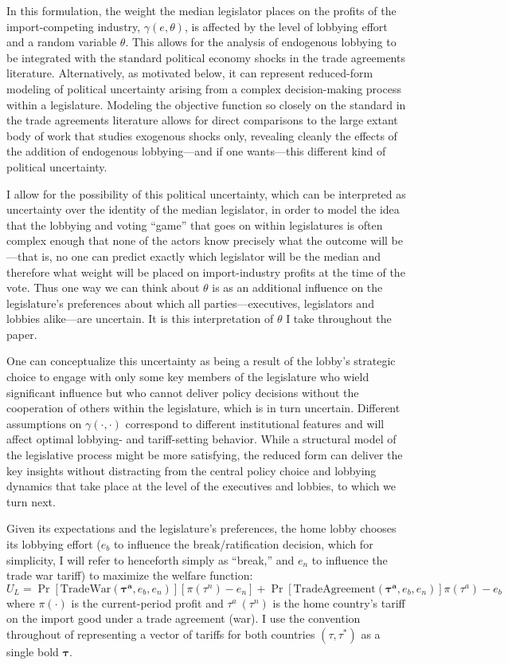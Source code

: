 \documentclass[10pt]{article}
\newcommand{\ve}{\theta}
\newcommand{\ta}{\theta}
\newcommand{\bta}{\bm{\tau^a}}
\newcommand{\ga}{\gamma}
\begin{document}
In this formulation, the weight the median legislator places on the profits of the import-competing industry, $\ga(e,\ve)$, is affected by the level of lobbying effort and a random variable $\ta$. This allows for the analysis of endogenous lobbying to be integrated with the standard political economy shocks in the trade agreements literature. Alternatively, as motivated below, it can represent reduced-form modeling of political uncertainty arising from a complex decision-making process within a legislature. Modeling the objective function so closely on the standard in the trade agreements literature allows for direct comparisons to the large extant body of work that studies exogenous shocks only, revealing cleanly the effects of the addition of endogenous lobbying---and if one wants---this different kind of political uncertainty.

I allow for the possibility of this political uncertainty, which can be interpreted as uncertainty over the identity of the median legislator, in order to model the idea that the lobbying and voting ``game'' that goes on within legislatures is often complex enough that none of the actors know precisely what the outcome will be---that is, no one can predict exactly which legislator will be the median and therefore what weight will be placed on import-industry profits at the time of the vote. Thus one way we can think about $\ta$ is as an additional influence on the legislature's preferences about which all parties---executives, legislators and lobbies alike---are uncertain. It is this interpretation of $\ta$ I take throughout the paper.

One can conceptualize this uncertainty as being a result of the lobby's strategic choice to engage with only some key members of the legislature who wield significant influence but who cannot deliver policy decisions without the cooperation of others within the legislature, which is in turn uncertain. Different assumptions on $\ga(\cdot,\cdot)$ correspond to different institutional features and will affect optimal lobbying- and tariff-setting behavior. While a structural model of the legislative process might be more satisfying, the reduced form can deliver the key insights without distracting from the central policy choice and lobbying dynamics that take place at the level of the executives and lobbies, to which we turn next. 

Given its expectations and the legislature's preferences, the home lobby chooses its lobbying effort ($e_b$ to influence the break/ratification decision, which for simplicity, I will refer to henceforth simply as ``break,'' and $e_n$ to influence the trade war tariff) to maximize the welfare function:
\begin{equation}
  U_L = \Pr\left[ \text{TradeWar}(\bta,e_b,e_n) \right] \left[ \pi(\tau^{\mathit{n}}) - e_n \right] + \Pr\left[ \text{TradeAgreement}(\bta,e_b,e_n) \right] \pi(\tau^a) - e_b
  \label{eq:lv}
\end{equation}
where $\pi(\cdot)$ is the current-period profit and $\tau^a \ (\tau^\mathit{n})$ is the home country's tariff on the import good under a trade agreement (war). I use the convention throughout of representing a vector of tariffs for both countries $(\tau,\tau^*)$ as a single bold $\bm{\tau}$. 
\end{document}
